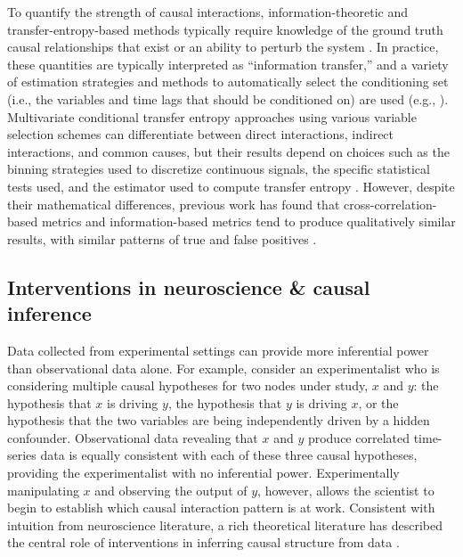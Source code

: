 To quantify the strength of causal interactions, information-theoretic
and transfer-entropy-based methods typically require knowledge of the
ground truth causal relationships that exist or an ability to perturb
the system . In practice, these quantities are typically interpreted as
``information transfer,'' and a variety of estimation strategies and
methods to automatically select the conditioning set (i.e., the
variables and time lags that should be conditioned on) are used (e.g.,
). Multivariate conditional transfer entropy approaches using various
variable selection schemes can differentiate between direct
interactions, indirect interactions, and common causes, but their
results depend on choices such as the binning strategies used to
discretize continuous signals, the specific statistical tests used, and
the estimator used to compute transfer entropy . However, despite their
mathematical differences, previous work has found that
cross-correlation-based metrics and information-based metrics tend to
produce qualitatively similar results, with similar patterns of true and
false positives .

\hypertarget{interventions-in-neuroscience-causal-inference}{%
\subsection{Interventions in neuroscience \& causal
inference}\label{interventions-in-neuroscience-causal-inference}}

Data collected from experimental settings can provide more inferential
power than observational data alone. For example, consider an
experimentalist who is considering multiple causal hypotheses for two
nodes under study, \(x\) and \(y\): the hypothesis that \(x\) is driving
\(y\), the hypothesis that \(y\) is driving \(x\), or the hypothesis
that the two variables are being independently driven by a hidden
confounder. Observational data revealing that \(x\) and \(y\) produce
correlated time-series data is equally consistent with each of these
three causal hypotheses, providing the experimentalist with no
inferential power. Experimentally manipulating \(x\) and observing the
output of \(y\), however, allows the scientist to begin to establish
which causal interaction pattern is at work. Consistent with intuition
from neuroscience literature, a rich theoretical literature has
described the central role of interventions in inferring causal
structure from data .

